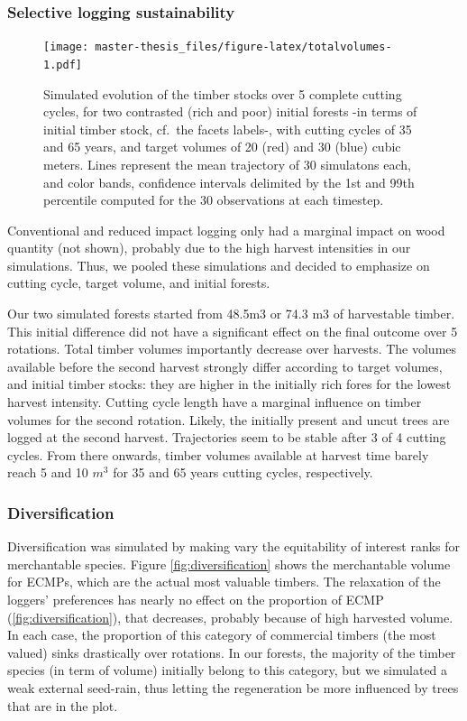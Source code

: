 \documentclass[12pt,]{article}
\theoremstyle{definition}
\theoremstyle{definition}
\theoremstyle{definition}
\theoremstyle{remark}
\begin{document}
\subsubsection{Selective logging
sustainability}\label{selective-logging-sustainability}

\begin{figure}
\centering
\texttt{[image: master-thesis\_files/figure-latex/totalvolumes-1.pdf]}
\caption{\label{fig:totalvolumes}Simulated evolution of the timber stocks
over 5 complete cutting cycles, for two contrasted (rich and poor)
initial forests -in terms of initial timber stock, cf.~the facets
labels-, with cutting cycles of 35 and 65 years, and target volumes of
20 (red) and 30 (blue) cubic meters. Lines represent the mean trajectory
of 30 simulatons each, and color bands, confidence intervals delimited
by the 1st and 99th percentile computed for the 30 observations at each
timestep.}
\end{figure}

Conventional and reduced impact logging only had a marginal impact on
wood quantity (not shown), probably due to the high harvest intensities
in our simulations. Thus, we pooled these simulations and decided to
emphasize on cutting cycle, target volume, and initial forests.

Our two simulated forests started from 48.5m3 or 74.3 m3 of harvestable
timber. This initial difference did not have a significant effect on the
final outcome over 5 rotations. Total timber volumes importantly
decrease over harvests. The volumes available before the second harvest
strongly differ according to target volumes, and initial timber stocks:
they are higher in the initially rich fores for the lowest harvest
intensity. Cutting cycle length have a marginal influence on timber
volumes for the second rotation. Likely, the initially present and uncut
trees are logged at the second harvest. Trajectories seem to be stable
after 3 of 4 cutting cycles. From there onwards, timber volumes
available at harvest time barely reach 5 and 10 \(m^3\) for 35 and 65
years cutting cycles, respectively.

\subsubsection{Diversification}\label{diversification}

Diversification was simulated by making vary the equitability of
interest ranks for merchantable species. Figure
\ref{fig:diversification} shows the merchantable volume for ECMPs, which
are the actual most valuable timbers. The relaxation of the loggers'
preferences has nearly no effect on the proportion of ECMP
(\ref{fig:diversification}), that decreases, probably because of high
harvested volume. In each case, the proportion of this category of
commercial timbers (the most valued) sinks drastically over rotations.
In our forests, the majority of the timber species (in term of volume)
initially belong to this category, but we simulated a weak external
seed-rain, thus letting the regeneration be more influenced by trees
that are in the plot.
\end{document}
